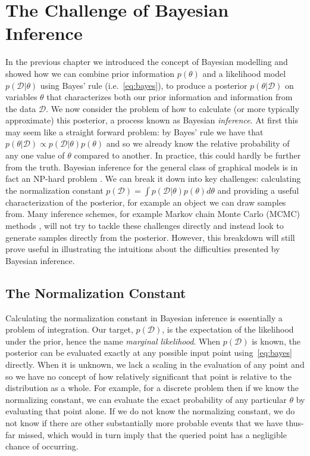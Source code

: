 
\section{The Challenge of Bayesian Inference}
\label{sec:inf:challenge}

In the previous chapter we introduced the concept of Bayesian modelling and showed how we
can combine prior information $p(\theta)$ and a likelihood model $p(\mathcal{D}|\theta)$ using Bayes' rule 
(i.e.~\eqref{eq:bayes}), to produce a posterior $p(\theta|\mathcal{D})$ on variables $\theta$ that
characterizes both our prior information and information from the data $\mathcal{D}$.  We now consider the
problem of how to calculate (or more typically approximate) this posterior, a process 
known as Bayesian \emph{inference}.
At first this may seem like a straight forward problem: by Bayes' rule we have that
$p(\theta|\mathcal{D})\propto p(\mathcal{D}|\theta)p(\theta)$ and so we already know the relative probability of any one
value of $\theta$ compared to another.  In practice, this could hardly be further from the
truth.  Bayesian inference for the general class of graphical models is in fact an 
NP-hard problem \citep{cooper1990computational,dagum1993approximating}.  We can break
it down into key challenges: calculating the normalization constant
$p(\mathcal{D}) = \int p(\mathcal{D}|\theta)p(\theta)d\theta$ and providing a useful characterization of the posterior, for
example an object we can draw samples from.  Many inference schemes, for example Markov
chain Monte Carlo (MCMC) methods \citep{hastings1970monte}, will not
try to tackle these challenges directly and instead look to generate samples directly from 
the posterior.  However, this breakdown will still prove useful in illustrating the intuitions
about the difficulties presented by Bayesian inference.

\subsection{The Normalization Constant}
\label{sec:inf:challenge:norm}

Calculating the normalization constant in Bayesian inference is essentially a problem of
integration.  Our target, $p(\mathcal{D})$, is the expectation of the likelihood under the prior,
hence the name \emph{marginal likelihood}.  When $p(\mathcal{D})$ is known, the posterior can be evaluated
exactly at any possible input point using~\eqref{eq:bayes} directly.  When it is unknown, we lack
a scaling in the evaluation of any point and so we have no concept of how relatively 
significant that point is relative to the distribution as a whole.  For example, for a discrete
problem then if we know the normalizing constant, we can evaluate the exact probability of any
particular $\theta$ by evaluating that point alone.  If we do not know the normalizing constant, we do
not know if there are other substantially more probable events that we have thus-far missed, which
would in turn imply that the queried point has a negligible chance of occurring.
 
